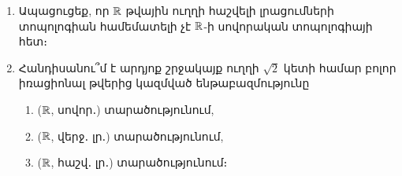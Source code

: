 \begin{enumerate}[label=\thesection.\arabic*.]
    \item Ապացուցեք, որ $\mathbb{R}$ թվային ուղղի հաշվելի լրացումների տոպոլոգիան համեմա\-տելի չէ $\mathbb{R}$-ի սովորական տոպոլոգիայի հետ։
    
    \item Հանդիսանու՞մ է արդյոք շրջակայք ուղղի $\sqrt{2}$ կետի համար բոլոր իռացիոնալ թվերից կազմված ենթաբազմությունը
        \begin{enumerate}
        \item[ա)] ($\mathbb{R}$, սովոր․) տարածությունում,
        
        \item[բ)] ($\mathbb{R}$, վերջ․ լր․) տարածությունում,
        
        \item[գ)] ($\mathbb{R}$, հաշվ․ լր․) տարածությունում։
    \end{enumerate}
\end{enumerate}